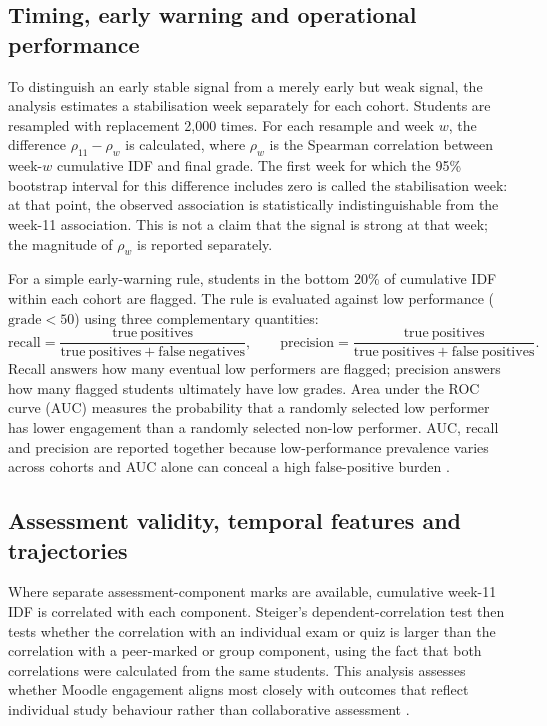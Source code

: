 \documentclass[11pt,a4paper]{article}
\begin{document}
\subsection{Timing, early warning and operational performance}
To distinguish an early stable signal from a merely early but weak signal, the
analysis estimates a stabilisation week separately for each cohort. Students are
resampled with replacement 2,000 times. For each resample and week $w$, the
difference $\rho_{11}-\rho_w$ is calculated, where $\rho_w$ is the Spearman
correlation between week-$w$ cumulative IDF and final grade. The first week for
which the 95\% bootstrap interval for this difference includes zero is called
the stabilisation week: at that point, the observed association is statistically
indistinguishable from the week-11 association. This is not a claim that the
signal is strong at that week; the magnitude of $\rho_w$ is reported separately.

For a simple early-warning rule, students in the bottom 20\% of cumulative IDF
within each cohort are flagged. The rule is evaluated against low performance
($\mathrm{grade}<50$) using three complementary quantities:
\[
\mathrm{recall} = \frac{\mathrm{true\ positives}}
                        {\mathrm{true\ positives}+\mathrm{false\ negatives}},
\qquad
\mathrm{precision} = \frac{\mathrm{true\ positives}}
                           {\mathrm{true\ positives}+\mathrm{false\ positives}}.
\]
Recall answers how many eventual low performers are flagged; precision answers
how many flagged students ultimately have low grades. Area under the ROC curve
(AUC) measures the probability that a randomly selected low performer has lower
engagement than a randomly selected non-low performer. AUC, recall and precision
are reported together because low-performance prevalence varies across cohorts
and AUC alone can conceal a high false-positive burden
\citep{conijn2017,johnston2025}.

\subsection{Assessment validity, temporal features and trajectories}
Where separate assessment-component marks are available, cumulative week-11 IDF
is correlated with each component. Steiger's dependent-correlation test
\citep{steiger1980} then tests whether the correlation with an individual exam or
quiz is larger than the correlation with a peer-marked or group component, using
the fact that both correlations were calculated from the same students. This
analysis assesses whether Moodle engagement aligns most closely with outcomes
that reflect individual study behaviour rather than collaborative assessment
\citep{almond2009}.
\end{document}
